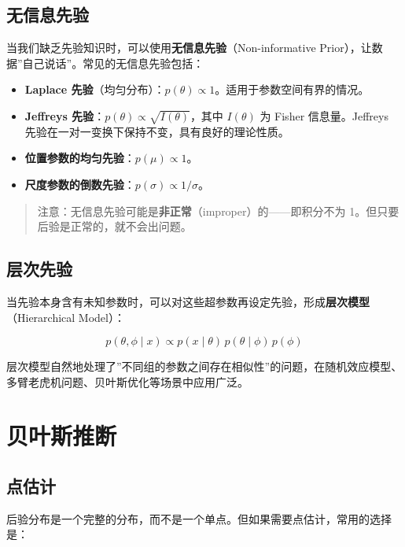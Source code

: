 \documentclass[
]{book}
\providecommand{\tightlist}{%
  \setlength{\itemsep}{0pt}\setlength{\parskip}{0pt}}
\begin{document}
\subsection{无信息先验}\label{ux65e0ux4fe1ux606fux5148ux9a8c}

当我们缺乏先验知识时，可以使用\textbf{无信息先验}（Non-informative Prior），让数据''自己说话''。常见的无信息先验包括：

\begin{itemize}
\tightlist
\item
  \textbf{Laplace 先验}（均匀分布）：\(p(\theta) \propto 1\)。适用于参数空间有界的情况。
\item
  \textbf{Jeffreys 先验}：\(p(\theta) \propto \sqrt{I(\theta)}\)，其中 \(I(\theta)\) 为 Fisher 信息量。Jeffreys 先验在一对一变换下保持不变，具有良好的理论性质。
\item
  \textbf{位置参数的均匀先验}：\(p(\mu) \propto 1\)。
\item
  \textbf{尺度参数的倒数先验}：\(p(\sigma) \propto 1/\sigma\)。
\end{itemize}

\begin{quote}
注意：无信息先验可能是\textbf{非正常}（improper）的------即积分不为 1。但只要后验是正常的，就不会出问题。
\end{quote}

\subsection{层次先验}\label{ux5c42ux6b21ux5148ux9a8c}

当先验本身含有未知参数时，可以对这些超参数再设定先验，形成\textbf{层次模型}（Hierarchical Model）：

\[p(\theta, \phi \mid x) \propto p(x \mid \theta) \, p(\theta \mid \phi) \, p(\phi)\]

层次模型自然地处理了''不同组的参数之间存在相似性''的问题，在随机效应模型、多臂老虎机问题、贝叶斯优化等场景中应用广泛。

\section{贝叶斯推断}\label{ux8d1dux53f6ux65afux63a8ux65ad}

\subsection{点估计}\label{ux70b9ux4f30ux8ba1-1}

后验分布是一个完整的分布，而不是一个单点。但如果需要点估计，常用的选择是：
\end{document}
